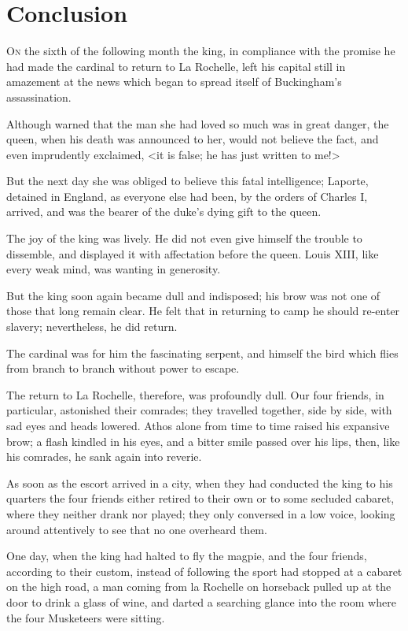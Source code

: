 
\chapter{Conclusion}

\lettrine[]{O}{n} the sixth of the following month the king, in compliance with the promise he had made the cardinal to return to La Rochelle, left his capital still in amazement at the news which began to spread itself of Buckingham's assassination. 

Although warned that the man she had loved so much was in great danger, the queen, when his death was announced to her, would not believe the fact, and even imprudently exclaimed, <it is false; he has just written to me!> 

But the next day she was obliged to believe this fatal intelligence; Laporte, detained in England, as everyone else had been, by the orders of Charles I, arrived, and was the bearer of the duke's dying gift to the queen. 

The joy of the king was lively. He did not even give himself the trouble to dissemble, and displayed it with affectation before the queen. Louis XIII, like every weak mind, was wanting in generosity. 

But the king soon again became dull and indisposed; his brow was not one of those that long remain clear. He felt that in returning to camp he should re-enter slavery; nevertheless, he did return. 

The cardinal was for him the fascinating serpent, and himself the bird which flies from branch to branch without power to escape. 

The return to La Rochelle, therefore, was profoundly dull. Our four friends, in particular, astonished their comrades; they travelled together, side by side, with sad eyes and heads lowered. Athos alone from time to time raised his expansive brow; a flash kindled in his eyes, and a bitter smile passed over his lips, then, like his comrades, he sank again into reverie. 

As soon as the escort arrived in a city, when they had conducted the king to his quarters the four friends either retired to their own or to some secluded cabaret, where they neither drank nor played; they only conversed in a low voice, looking around attentively to see that no one overheard them. 

One day, when the king had halted to fly the magpie, and the four friends, according to their custom, instead of following the sport had stopped at a cabaret on the high road, a man coming from la Rochelle on horseback pulled up at the door to drink a glass of wine, and darted a searching glance into the room where the four Musketeers were sitting. 

